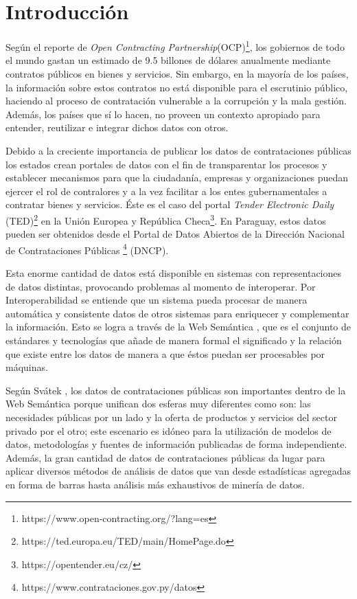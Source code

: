 \chapter{Introducción}
\label{chap:introduccion}




Según el reporte de \textit{Open Contracting Partnership}(OCP)\footnote{https://www.open-contracting.org/?lang=es}, los gobiernos de todo el mundo gastan un estimado de 9.5 billones de dólares anualmente mediante contratos públicos en bienes y servicios. Sin embargo, en la mayoría de los países, la información sobre estos contratos no está disponible para el escrutinio público, haciendo al proceso de contratación vulnerable a la corrupción y la mala gestión. Además, los países que sí lo hacen, no proveen un contexto apropiado para entender, reutilizar e integrar dichos datos con otros.

Debido a la creciente importancia de publicar los datos de contrataciones públicas los estados crean portales de datos con el fin de transparentar los procesos y establecer mecanismos para que la ciudadanía, empresas y organizaciones puedan ejercer el rol de contralores y a la vez facilitar a los entes gubernamentales a contratar bienes y servicios. Éste es el caso del portal \textit{Tender Electronic Daily} (TED)\footnote{https://ted.europa.eu/TED/main/HomePage.do}  en la Unión Europea y República Checa\footnote{https://opentender.eu/cz/}. En Paraguay, estos datos pueden ser obtenidos desde el Portal de Datos Abiertos de la Dirección Nacional de Contrataciones Públicas \footnote{https://www.contrataciones.gov.py/datos} (DNCP).

Esta enorme cantidad de datos está disponible en sistemas con representaciones de datos distintas, provocando problemas al momento de interoperar. Por Interoperabilidad se entiende que un sistema pueda procesar de manera automática y consistente datos de otros sistemas para enriquecer y complementar la información. Esto se logra a través de la Web Semántica \cite{Semantic20:online}, que es el conjunto de estándares y tecnologías que añade de manera formal el significado y la relación que existe entre los datos de manera a que éstos puedan ser procesables por máquinas.

Según Svátek \cite{svatek2014linked}, los datos de contrataciones públicas son importantes dentro de la Web Semántica \cite{Semantic20:online} porque unifican dos esferas muy diferentes como son: las necesidades públicas por un lado y la oferta de productos y servicios del sector privado por el otro; este escenario es idóneo para la utilización de modelos de datos, metodologías y fuentes de información publicadas de forma independiente. Además, la gran cantidad de datos de contrataciones públicas da lugar para aplicar diversos métodos de análisis de datos que van desde estadísticas agregadas en forma de barras hasta análisis más exhaustivos de minería de datos.



